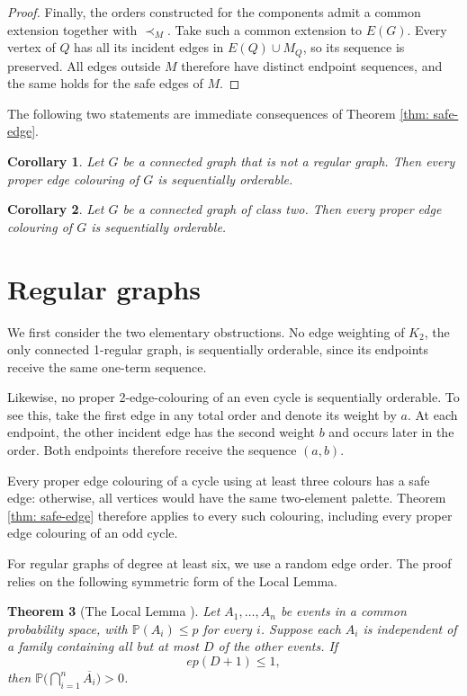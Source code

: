 \documentclass[a4paper,12pt]{elsarticle}
\newtheorem{theorem}{Theorem}
\newtheorem{corollary}[theorem]{Corollary}
\newcommand{\probP}{{\mathbb{P}}}
\begin{document}
\begin{proof}
    Finally, the orders constructed for the components admit a common extension together with $\prec_M$. Take such a common extension to $E(G)$. Every vertex of $Q$ has all its incident edges in $E(Q)\cup M_Q$, so its sequence is preserved. All edges outside $M$ therefore have distinct endpoint sequences, and the same holds for the safe edges of $M$.
\end{proof}

The following two statements are immediate consequences of Theorem \ref{thm: safe-edge}.

\begin{corollary} Let $G$ be a connected graph that is not a regular graph. Then every proper edge colouring of $G$ is sequentially orderable.
\end{corollary}

\begin{corollary} Let $G$ be a connected graph of class two. Then every proper edge colouring of $G$ is sequentially orderable.
\end{corollary}

\section{Regular graphs}

We first consider the two elementary obstructions. No edge weighting of $K_2$, the only connected 1-regular graph, is sequentially orderable, since its endpoints receive the same one-term sequence.

Likewise, no proper 2-edge-colouring of an even cycle is sequentially orderable. To see this, take the first edge in any total order and denote its weight by $a$. At each endpoint, the other incident edge has the second weight $b$ and occurs later in the order. Both endpoints therefore receive the sequence $(a,b)$.

Every proper edge colouring of a cycle using at least three colours has a safe edge: otherwise, all vertices would have the same two-element palette. Theorem \ref{thm: safe-edge} therefore applies to every such colouring, including every proper edge colouring of an odd cycle.

For regular graphs of degree at least six, we use a random edge order. The proof relies on the following symmetric form of the Local Lemma.

\begin{theorem}[The Local Lemma \cite{AlonSpencer}]
\label{LLL-symmetric}
Let $A_1,\dots,A_n$ be events in a common probability space, with $\probP(A_i)\leq p$ for every $i$.
Suppose each $A_i$ is independent of a family containing all but at most $D$ of the other events. If
\[
    ep(D+1)\leq1,
\]
then $\probP\bigl(\bigcap_{i=1}^n\overline{A_i}\bigr)>0$.
\end{theorem}
\end{document}
